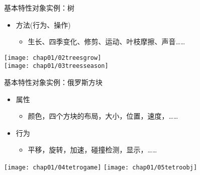 \begin{frame}{基本特性}{对象实例：树}
  \stretchon
  \begin{itemize}
  \item 方法(行为、操作)
    \begin{itemize}
    \item 生长、四季变化、修剪、运动、叶枝摩擦、声音\ldots\ldots
    \end{itemize}
  \end{itemize}
  \vspace{-1ex}
  \centering
    \texttt{[image: chap01/02treesgrow]} \\[1ex]%
    \texttt{[image: chap01/03treesseason]} %
  \stretchoff
\end{frame}

\begin{frame}{基本特性}{对象实例：俄罗斯方块}
  \stretchon
  \begin{itemize}
  \item 属性
    \begin{itemize}
    \item 颜色，四个方块的布局，大小，位置，速度，\ldots\ldots
    \end{itemize}
  \item 行为
    \begin{itemize}
    \item 平移，旋转，加速，碰撞检测，显示，\ldots\ldots
    \end{itemize}
  \end{itemize}
  \centering
    \texttt{[image: chap01/04tetrogame]} \qquad%
    \texttt{[image: chap01/05tetroobj]} %
  \stretchoff
\end{frame}

